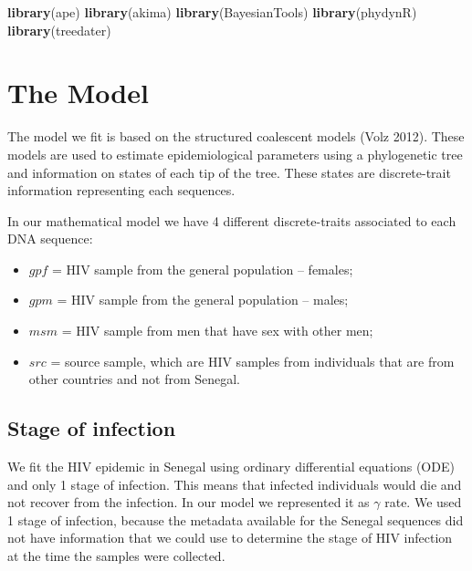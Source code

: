 \documentclass[12pt,]{article}
\newenvironment{Shaded}{\begin{snugshade}}{\end{snugshade}}
\newcommand{\KeywordTok}[1]{\textcolor[rgb]{0.13,0.29,0.53}{\textbf{#1}}}
\newcommand{\NormalTok}[1]{#1}
\providecommand{\tightlist}{%
  \setlength{\itemsep}{0pt}\setlength{\parskip}{0pt}}
\begin{document}
\begin{Shaded}
\begin{Highlighting}[]
  \KeywordTok{library}\NormalTok{(ape)}
  \KeywordTok{library}\NormalTok{(akima)}
  \KeywordTok{library}\NormalTok{(BayesianTools)}
  \KeywordTok{library}\NormalTok{(phydynR)}
  \KeywordTok{library}\NormalTok{(treedater)}
\end{Highlighting}
\end{Shaded}

\hypertarget{the-model}{%
\section{The Model}\label{the-model}}

The model we fit is based on the structured coalescent models (Volz
2012). These models are used to estimate epidemiological parameters
using a phylogenetic tree and information on states of each tip of the
tree. These states are discrete-trait information representing each
sequences.

In our mathematical model we have 4 different discrete-traits associated
to each DNA sequence:

\begin{itemize}
\tightlist
\item
  \(gpf\) = HIV sample from the general population -- females;
\item
  \(gpm\) = HIV sample from the general population -- males;
\item
  \(msm\) = HIV sample from men that have sex with other men;
\item
  \(src\) = source sample, which are HIV samples from individuals that
  are from other countries and not from Senegal.
\end{itemize}

\hypertarget{stage-of-infection}{%
\subsection{Stage of infection}\label{stage-of-infection}}

We fit the HIV epidemic in Senegal using ordinary differential equations
(ODE) and only 1 stage of infection. This means that infected
individuals would die and not recover from the infection. In our model
we represented it as \(\gamma\) rate. We used 1 stage of infection,
because the metadata available for the Senegal sequences did not have
information that we could use to determine the stage of HIV infection at
the time the samples were collected.
\end{document}
